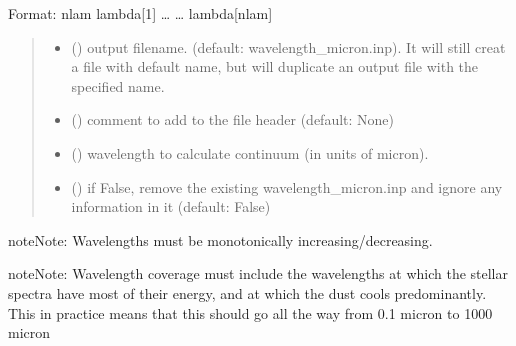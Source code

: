\documentclass[a4paper,11pt,english]{sphinxmanual}
\begin{document}
\begin{fulllineitems}
\begin{fulllineitems}
\sphinxAtStartPar
Format:
nlam
lambda{[}1{]}
…
…
lambda{[}nlam{]}

\sphinxAtStartPar
{}
\begin{quote}\begin{description}
\begin{itemize}
\item {} 
\sphinxAtStartPar
{} () \textendash{} output filename. (default: wavelength\_micron.inp).
It will still creat a file with default name,
but will duplicate an output file with the specified name.

\item {} 
\sphinxAtStartPar
{} () \textendash{} comment to add to the file header (default: None)

\item {} 
\sphinxAtStartPar
{} () \textendash{} wavelength to calculate continuum (in units of micron).

\item {} 
\sphinxAtStartPar
{} () \textendash{} if False, remove the existing wavelength\_micron.inp and ignore any information in it (default: False)

\end{itemize}

\end{description}\end{quote}

\begin{sphinxadmonition}{note}{Note:}
\sphinxAtStartPar
Wavelengths must be monotonically increasing/decreasing.
\end{sphinxadmonition}

\begin{sphinxadmonition}{note}{Note:}
\sphinxAtStartPar
Wavelength coverage must include the wavelengths at which the stellar spectra have most of their energy,
and at which the dust cools predominantly. This in practice means that this should go all the way from
0.1 micron to 1000 micron
\end{sphinxadmonition}


\end{fulllineitems}
\end{fulllineitems}
\end{document}
